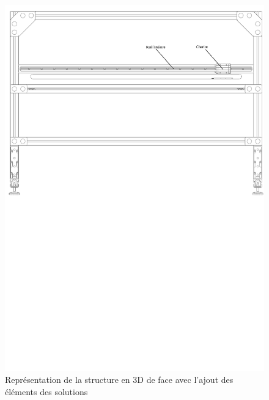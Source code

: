\begin{figure}[H]
  \centering
  \includegraphics[width = \textwidth]{assets/figures/VueFace.svg}
  \caption{Représentation de la structure en 3D de face avec l'ajout des éléments des solutions}
  \label{fig:VueFace}
\end{figure}

